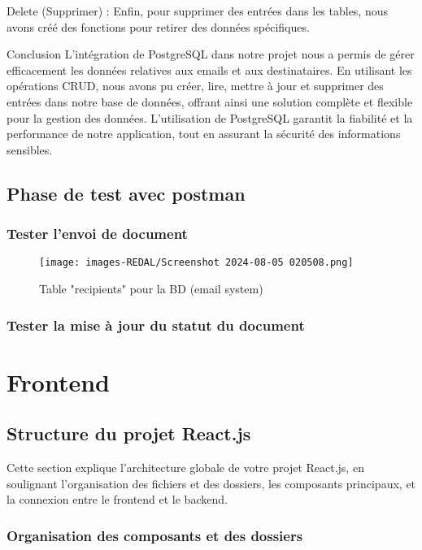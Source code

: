 Delete (Supprimer) :
Enfin, pour supprimer des entrées dans les tables, nous avons créé des fonctions pour retirer des données spécifiques.


Conclusion
L'intégration de PostgreSQL dans notre projet nous a permis de gérer efficacement les données relatives aux emails et aux destinataires. En utilisant les opérations CRUD, nous avons pu créer, lire, mettre à jour et supprimer des entrées dans notre base de données, offrant ainsi une solution complète et flexible pour la gestion des données. L'utilisation de PostgreSQL garantit la fiabilité et la performance de notre application, tout en assurant la sécurité des informations sensibles.





\subsection{Phase de test avec postman}
\subsubsection{Tester l'envoi de document}
\begin{figure}[H]
\begin{center}
\texttt{[image: images-REDAL/Screenshot 2024-08-05 020508.png]}
\end{center}
\caption{Table "recipients" pour la BD (email system)}
\end{figure}

\subsubsection{Tester la mise à jour du statut du document}

\section{Frontend}

\subsection{Structure du projet React.js}
Cette section explique l'architecture globale de votre projet React.js, en soulignant l'organisation des fichiers et des dossiers, les composants principaux, et la connexion entre le frontend et le backend.

\subsubsection{Organisation des composants et des dossiers}


